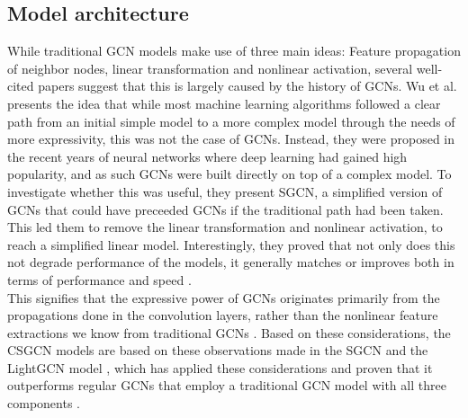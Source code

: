 \subsection{Model architecture}\label{subsec:csgcn_is_model_architecture}
While traditional GCN models make use of three main ideas: Feature propagation of neighbor nodes, linear transformation and nonlinear activation, several well-cited papers \cite{SimplifyingGCN,LightGCN,HeteGCN} suggest that this is largely caused by the history of GCNs.
Wu et al. presents the idea that while most machine learning algorithms followed a clear path from an initial simple model to a more complex model through the needs of more expressivity, this was not the case of GCNs.
Instead, they were proposed in the recent years of neural networks where deep learning had gained high popularity, and as such GCNs were built directly on top of a complex model.
To investigate whether this was useful, they present SGCN, a simplified version of GCNs that could have preceeded GCNs if the traditional path had been taken.
This led them to remove the linear transformation and nonlinear activation, to reach a simplified linear model.
Interestingly, they proved that not only does this not degrade performance of the models, it generally matches or improves both in terms of performance and speed \cite{SimplifyingGCN}.\\
This signifies that the expressive power of GCNs originates primarily from the propagations done in the convolution layers, rather than the nonlinear feature extractions we know from traditional GCNs \cite{SimplifyingGCN}.
Based on these considerations, the CSGCN models are based on these observations made in the SGCN \cite{SimplifyingGCN} and the LightGCN model \cite{LightGCN}, which has applied these considerations and proven that it outperforms regular GCNs that employ a traditional GCN model with all three components \cite{LightGCN}.



